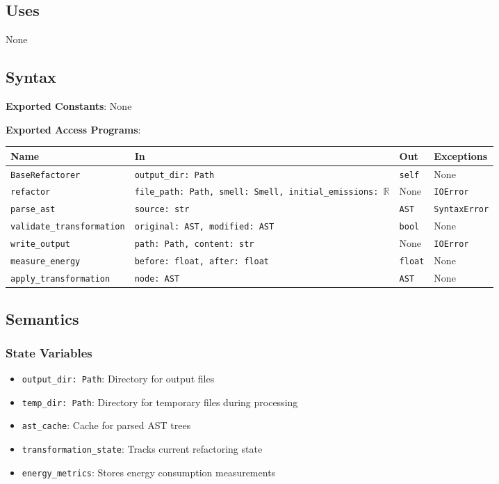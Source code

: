 \documentclass[12pt, titlepage]{article}
\begin{document}
\subsection{Uses}

None

\subsection{Syntax}
\noindent
\textbf{Exported Constants}: None

\noindent
\textbf{Exported Access Programs}:

\begin{tabularx}{\linewidth}{|l|>{\raggedright\arraybackslash}X|l|l|}
\hline
\textbf{Name} & \textbf{In} & \textbf{Out} & \textbf{Exceptions} \\\hline
\texttt{BaseRefactorer} & \texttt{output\_dir: Path} & \texttt{self} & None \\\hline
\texttt{refactor} & \texttt{file\_path: Path, smell: Smell, initial\_emissions: $\mathbb{R}$} & None & \texttt{IOError} \\\hline
\texttt{parse\_ast} & \texttt{source: str} & \texttt{AST} & \texttt{SyntaxError} \\\hline
\texttt{validate\_transformation} & \texttt{original: AST, modified: AST} & \texttt{bool} & None \\\hline
\texttt{write\_output} & \texttt{path: Path, content: str} & None & \texttt{IOError} \\\hline
\texttt{measure\_energy} & \texttt{before: float, after: float} & \texttt{float} & None \\\hline
\texttt{apply\_transformation} & \texttt{node: AST} & \texttt{AST} & None \\\hline
\end{tabularx}

\subsection{Semantics}

\subsubsection{State Variables}
\begin{itemize}
  \item \texttt{output\_dir: Path}: Directory for output files
  \item \texttt{temp\_dir: Path}: Directory for temporary files during processing
  \item \texttt{ast\_cache}: Cache for parsed AST trees
  \item \texttt{transformation\_state}: Tracks current refactoring state
  \item \texttt{energy\_metrics}: Stores energy consumption measurements
\end{itemize}
\end{document}
